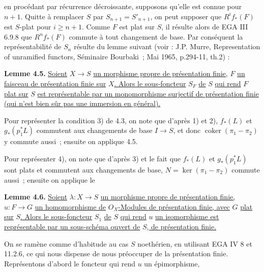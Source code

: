 
en procédant par récurrence décroissante, supposons qu'elle est connue pour \(n+1\). Quitte à remplacer \(S\) par \(S_{n+1}=S'_{n+1}\), on peut supposer que \(R^if_*(F)\) est \(S\)-plat pour \(i\ge n+1\). Comme \(F\) est plat sur \(S\), il résulte alors de EGA III 6.9.8 que \(R^nf_*(F)\) commute à tout changement de base. Par conséquent la représentabilité de \(S_n\) résulte du lemme suivant (voir : J.P. Murre, Representation of unramified functors, Séminaire Bourbaki~; Mai 1965, p.294-11, th.2) :

\textbf{Lemme 4.5.} \uline{Soient} \(X\to S\) \uline{un morphisme propre de présentation finie,} \(F\) \uline{un faisceau de présentation finie sur} \(X\)\uline{. Alors le sous-foncteur} \(S_F\) \uline{de} \(S\) \uline{qui rend} \(F\) \uline{plat sur} \(S\) \uline{est représentable par un monomorphisme surjectif de présentation finie (qui n'est bien sûr pas une immersion en général).}

Pour représenter la condition 3) de 4.3, on note que d'après 1) et 2), \(f_*(L)\) et \(g_*(p_1^*L)\) commutent aux changements de base \(I\to S\), et donc \(\operatorname{coker}(\pi_1-\pi_2)\) y commute aussi~; ensuite on applique 4.5.

Pour représenter 4), on note que d'après 3) et le fait que \(f_*(L)\) et \(g_*(p_1^*L)\) sont plats et commutent aux changements de base, \(N=\ker(\pi_1-\pi_2)\) commute aussi~; ensuite on applique le

\textbf{Lemme 4.6.} \uline{Soient} \(\lambda:X\to S\) \uline{un morphisme propre de présentation finie,} \(u:F\to G\) \uline{un homomorphisme de} \({O}_X\)\uline{-Modules de présentation finie, avec} \(G\) \uline{plat sur} \(S\)\uline{. Alors le sous-foncteur} \(S_1\) \uline{de} \(S\) \uline{qui rend} \(u\) \uline{un isomorphisme est représentable par un sous-schéma ouvert de} \(S\)\uline{, de présentation finie.}

On se ramène comme d'habitude au cas \(S\) noethérien, en utilisant EGA IV 8 et 11.2.6, ce qui nous dispense de nous préoccuper de la présentation finie. Représentons d'abord le foncteur qui rend \(u\) un épimorphisme,
